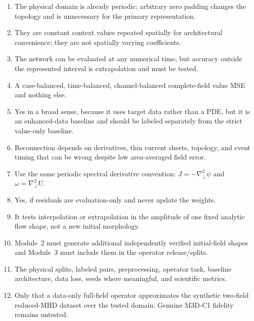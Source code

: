 \documentclass[11pt]{article}
\newcommand{\Lap}{\nabla_\perp^2}
\begin{document}
\begin{enumerate}[label=\textbf{A\arabic*.}]
  \item The physical domain is already periodic; arbitrary zero padding changes the topology and is unnecessary for the primary representation.
  \item They are constant context values repeated spatially for architectural convenience; they are not spatially varying coefficients.
  \item The network can be evaluated at any numerical time, but accuracy outside the represented interval is extrapolation and must be tested.
  \item A case-balanced, time-balanced, channel-balanced complete-field value MSE and nothing else.
  \item Yes in a broad sense, because it uses target data rather than a PDE, but it is an enhanced-data baseline and should be labeled separately from the strict value-only baseline.
  \item Reconnection depends on derivatives, thin current sheets, topology, and event timing that can be wrong despite low area-averaged field error.
  \item Use the same periodic spectral derivative convention: $J=-\Lap\psi$ and $\omega=\Lap U$.
  \item Yes, if residuals are evaluation-only and never update the weights.
  \item It tests interpolation or extrapolation in the amplitude of one fixed analytic flow shape, not a new initial morphology.
  \item Module~2 must generate additional independently verified initial-field shapes and Module~3 must include them in the operator release/splits.
  \item The physical splits, labeled pairs, preprocessing, operator task, baseline architecture, data loss, seeds where meaningful, and scientific metrics.
  \item Only that a data-only full-field operator approximates the synthetic two-field reduced-MHD dataset over the tested domain. Genuine M3D-C1 fidelity remains untested.
\end{enumerate}
\end{document}
